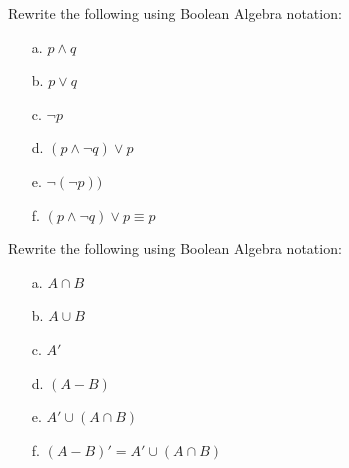 \documentclass[a4paper,12pt]{book}
\newcounter{question}
\begin{document}
		\newpage
		
        \begin{questionNOGRADE}{\thequestion}
			
			Rewrite the following using Boolean Algebra notation:
			
			\begin{enumerate}
				\item[a.] 	$p \land q$							
				\item[b.] 	$p \lor q$								
				\item[c.] 	$\neg p$								
				\item[d.]	$(p \land \neg q) \lor p$			
				\item[e.]	$\neg(\neg p))$						
				\item[f.]	$(p \land \neg q) \lor p \equiv p$	
			\end{enumerate}
			
        \end{questionNOGRADE}
        
		\hrulefill
		
        \begin{questionNOGRADE}{\thequestion}
			
			Rewrite the following using Boolean Algebra notation:
			
			\begin{enumerate}
				\item[a.] 	$A \cap B$								
				\item[b.] 	$A \cup B$								
				\item[c.] 	$A'$									
				\item[d.]	$(A-B)$									
				\item[e.]	$A' \cup (A \cap B)$					
				\item[f.]	$(A - B)' = A' \cup (A \cap B)$		
			\end{enumerate}
			
        \end{questionNOGRADE}
        
        
\end{document}
